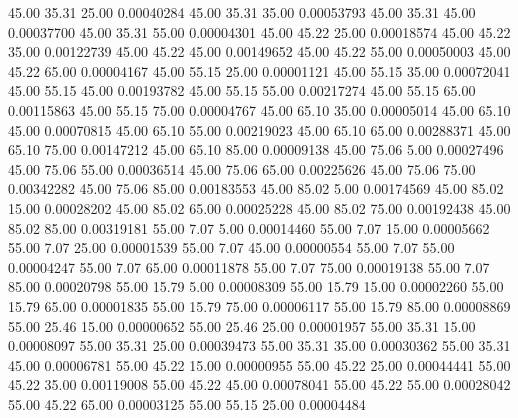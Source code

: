      45.00     35.31     25.00     0.00040284
     45.00     35.31     35.00     0.00053793
     45.00     35.31     45.00     0.00037700
     45.00     35.31     55.00     0.00004301
     45.00     45.22     25.00     0.00018574
     45.00     45.22     35.00     0.00122739
     45.00     45.22     45.00     0.00149652
     45.00     45.22     55.00     0.00050003
     45.00     45.22     65.00     0.00004167
     45.00     55.15     25.00     0.00001121
     45.00     55.15     35.00     0.00072041
     45.00     55.15     45.00     0.00193782
     45.00     55.15     55.00     0.00217274
     45.00     55.15     65.00     0.00115863
     45.00     55.15     75.00     0.00004767
     45.00     65.10     35.00     0.00005014
     45.00     65.10     45.00     0.00070815
     45.00     65.10     55.00     0.00219023
     45.00     65.10     65.00     0.00288371
     45.00     65.10     75.00     0.00147212
     45.00     65.10     85.00     0.00009138
     45.00     75.06      5.00     0.00027496
     45.00     75.06     55.00     0.00036514
     45.00     75.06     65.00     0.00225626
     45.00     75.06     75.00     0.00342282
     45.00     75.06     85.00     0.00183553
     45.00     85.02      5.00     0.00174569
     45.00     85.02     15.00     0.00028202
     45.00     85.02     65.00     0.00025228
     45.00     85.02     75.00     0.00192438
     45.00     85.02     85.00     0.00319181
     55.00      7.07      5.00     0.00014460
     55.00      7.07     15.00     0.00005662
     55.00      7.07     25.00     0.00001539
     55.00      7.07     45.00     0.00000554
     55.00      7.07     55.00     0.00004247
     55.00      7.07     65.00     0.00011878
     55.00      7.07     75.00     0.00019138
     55.00      7.07     85.00     0.00020798
     55.00     15.79      5.00     0.00008309
     55.00     15.79     15.00     0.00002260
     55.00     15.79     65.00     0.00001835
     55.00     15.79     75.00     0.00006117
     55.00     15.79     85.00     0.00008869
     55.00     25.46     15.00     0.00000652
     55.00     25.46     25.00     0.00001957
     55.00     35.31     15.00     0.00008097
     55.00     35.31     25.00     0.00039473
     55.00     35.31     35.00     0.00030362
     55.00     35.31     45.00     0.00006781
     55.00     45.22     15.00     0.00000955
     55.00     45.22     25.00     0.00044441
     55.00     45.22     35.00     0.00119008
     55.00     45.22     45.00     0.00078041
     55.00     45.22     55.00     0.00028042
     55.00     45.22     65.00     0.00003125
     55.00     55.15     25.00     0.00004484
